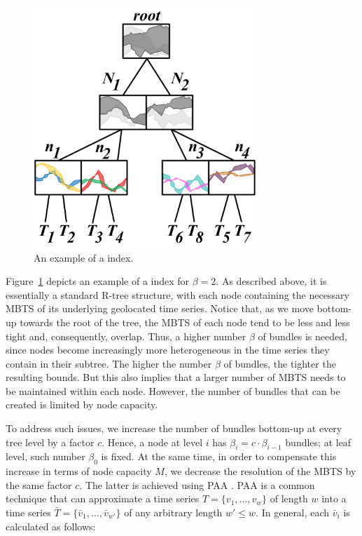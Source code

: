 \begin{figure}[!ht]
 \centering
 \includegraphics[width=0.75\textwidth]{figures/btsr_tree.png}
 \caption{An example of a \btsr index.}
 \label{fig:btsr_tree}
\end{figure}

Figure~\ref{fig:btsr_tree} depicts an example of a \btsr index for $\beta=2$. As described above, it is essentially a standard R-tree structure, with each node containing the necessary MBTS of its underlying geolocated time series. Notice that, as we move bottom-up towards the root of the tree, the MBTS of each node tend to be less and less tight and, consequently, overlap. Thus, a higher number $\beta$ of bundles is needed, since nodes become increasingly more heterogeneous in the time series they contain in their subtree. The higher the number $\beta$ of bundles, the tighter the resulting bounds. But this also implies that a larger number of MBTS needs to be maintained within each node. However, the number of bundles that can be created is limited by node capacity.

To address such issues, we increase the number of bundles bottom-up at every tree level by a factor $c$. Hence, a node at level $i$ has $\beta_{i} = c \cdot \beta_{i-1}$ bundles; at leaf level, such number $\beta_0$ is fixed. At the same time, in order to compensate this increase in terms of node capacity $M$, we decrease the resolution of the MBTS by the same factor $c$. The latter is achieved using PAA \cite{keogh2001paa,faloutsos2000vldb}. PAA is a common technique that can approximate a time series $T = \{v_1, \ldots, v_w\}$ of length $w$ into a time series $\bar{T} = \{\bar{v}_1, \ldots, \bar{v}_{w'}\}$ of any arbitrary length $w' \leq w$. In general, each $\bar{v}_i$ is calculated as follows:


